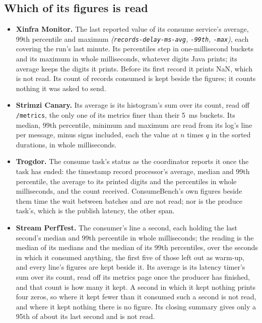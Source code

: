 \documentclass[11pt]{article}
\newcommand{\gl}[1]{{\color{soft}\itshape\small (#1)}}
\begin{document}
\subsection*{Which of its figures is read}
\begin{itemize}
  \item \textbf{Xinfra Monitor.} The last reported value of its consume service's average,
        99th percentile and maximum \gl{\texttt{records-delay-ms-avg}, \texttt{-99th}, \texttt{-max}},
        each covering the run's last minute. Its percentiles step in one-millisecond buckets and
        its maximum in whole milliseconds, whatever digits Java prints; its average keeps the
        digits it prints. Before its first record it prints NaN, which is not read. Its count of
        records consumed is kept beside the figures; it counts nothing it was asked to send.
  \item \textbf{Strimzi Canary.} Its average is its histogram's sum over its count, read off
        \texttt{/metrics}, the only one of its metrics finer than their 5~ms buckets. Its median,
        99th percentile, minimum and maximum are read from its log's line per message, minus signs
        included, each the value at $n$ times $q$ in the sorted durations, in whole milliseconds.
  \item \textbf{Trogdor.} The consume task's status as the coordinator reports it once the task has
        ended: the timestamp record processor's average, median and 99th percentile, the average
        to its printed digits and the percentiles in whole milliseconds, and the count received.
        ConsumeBench's own figures beside them time the wait between batches and are not read;
        nor is the produce task's, which is the publish latency, the other span.
  \item \textbf{Stream PerfTest.} The consumer's line a second, each holding the last second's
        median and 99th percentile in whole milliseconds; the reading is the median of its medians
        and the median of its 99th percentiles, over the seconds in which it consumed anything,
        the first five of those left out as warm-up, and every line's figures are kept beside it.
        Its average is its latency timer's sum over its count, read off its metrics page once the
        producer has finished, and that count is how many it kept. A second in which it kept
        nothing prints four zeros, so where it kept fewer than it consumed such a second is not
        read, and where it kept nothing there is no figure. Its closing summary gives only a 95th
        of about its last second and is not read.
\end{itemize}
\end{document}
